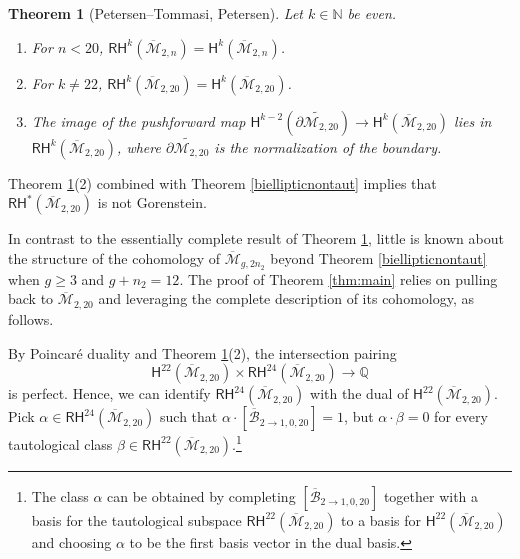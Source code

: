 \documentclass[12pt]{amsart}
\newtheorem{thm}{Theorem}
\theoremstyle{definition}
\renewcommand{\H}{\mathsf{H}}
\newcommand{\qq}{\mathbb{Q}}
\newcommand{\RH}{\mathsf{RH}}
\newcommand{\Bb}{\overline{\mathcal{B}}}
\newcommand{\M}{\mathcal{M}}
\renewcommand{\tilde}{\widetilde}
\newcommand{\Mb}{\overline{\M}}
\begin{document}
\begin{thm}[Petersen--Tommasi, Petersen]\label{PetersenTommasi}
Let $k\in \mathbb{N}$ be even.
    \begin{enumerate}
        \item For $n<20$, $\RH^{k}(\Mb_{2,n})=\H^{k}(\Mb_{2,n})$.
        \item For $k\neq 22$, $\RH^{k}(\Mb_{2,20})=\H^{k}(\Mb_{2,20})$.
        \item The image of the pushforward map $\H^{k-2}(\tilde{\partial\M_{2,20}})\rightarrow \H^{k}(\Mb_{2,20})$ lies in $\RH^k(\Mb_{2,20})$, where $\tilde{\partial\M_{2,20}}$ is the normalization of the boundary.
    \end{enumerate}
\end{thm}
\noindent Theorem \ref{PetersenTommasi}(2) combined with Theorem \ref{biellipticnontaut} implies that $\RH^*(\Mb_{2,20})$ is not Gorenstein.

In contrast to the essentially complete result of Theorem \ref{PetersenTommasi}, little is known about the structure of the cohomology of $\Mb_{g,2n_2}$ beyond Theorem \ref{biellipticnontaut} when $g\geq 3$ and $g+n_2=12$. The proof of Theorem \ref{thm:main} relies on pulling back to $\Mb_{2,20}$ and leveraging the complete description of its cohomology, as follows. 


By Poincar\'e duality and Theorem \ref{PetersenTommasi}(2), the intersection pairing
\[
\H^{22}(\Mb_{2,20})\times \RH^{24}(\Mb_{2,20})\rightarrow \qq
\]
is perfect. Hence, we can identify $\RH^{24}(\Mb_{2,20})$ with the dual of $\H^{22}(\Mb_{2,20})$. Pick $\alpha\in \RH^{24}(\Mb_{2,20})$ such that $\alpha \cdot [\Bb_{2\rightarrow 1,0,20}]=1$, but $\alpha\cdot \beta=0$ for every tautological class $\beta\in \RH^{22}(\Mb_{2,20})$.\footnote{The class $\alpha$ can be obtained by completing $[\Bb_{2\rightarrow 1,0,20}]$ together with a basis for the tautological subspace $\RH^{22}(\Mb_{2,20})$ to a basis for $\H^{22}(\Mb_{2,20})$ and choosing $\alpha$ to be the first basis vector in the dual basis.} 
\end{document}
